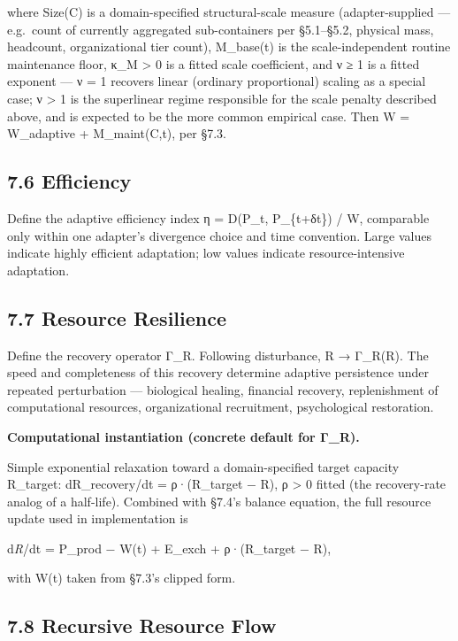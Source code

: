 \documentclass[
]{article}
\begin{document}
where Size(C) is a domain-specified structural-scale measure
(adapter-supplied --- e.g.~count of currently aggregated sub-containers
per §5.1--§5.2, physical mass, headcount, organizational tier count),
M\_base(t) is the scale-independent routine maintenance floor, κ\_M
\textgreater{} 0 is a fitted scale coefficient, and ν ≥ 1 is a fitted
exponent --- ν = 1 recovers linear (ordinary proportional) scaling as a
special case; ν \textgreater{} 1 is the superlinear regime responsible
for the scale penalty described above, and is expected to be the more
common empirical case. Then W = W\_adaptive + M\_maint(C,t), per §7.3.

\hypertarget{efficiency}{%
\subsection{7.6 Efficiency}\label{efficiency}}

Define the adaptive efficiency index η = D(P\_t, P\_\{t+δt\}) / W,
comparable only within one adapter's divergence choice and time
convention. Large values indicate highly efficient adaptation; low
values indicate resource-intensive adaptation.

\hypertarget{resource-resilience}{%
\subsection{7.7 Resource Resilience}\label{resource-resilience}}

Define the recovery operator Γ\_R. Following disturbance, R → Γ\_R(R).
The speed and completeness of this recovery determine adaptive
persistence under repeated perturbation --- biological healing,
financial recovery, replenishment of computational resources,
organizational recruitment, psychological restoration.

\textbf{Computational instantiation (concrete default for Γ\_R).}

Simple exponential relaxation toward a domain-specified target capacity
R\_target: dR\_recovery/dt = ρ·(R\_target − R), ρ \textgreater{} 0
fitted (the recovery-rate analog of a half-life). Combined with §7.4's
balance equation, the full resource update used in implementation is

d\emph{R}/dt = P\_prod − W(t) + E\_exch + ρ·(R\_target − R),

with W(t) taken from §7.3's clipped form.

\hypertarget{recursive-resource-flow}{%
\subsection{7.8 Recursive Resource Flow}\label{recursive-resource-flow}}
\end{document}
